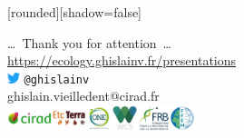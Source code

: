 
{
  [rounded][shadow=false]
  \begin{frame}[plain]
    \begin{block}{}
      \begin{center}
        \ldots~Thank you for attention~\ldots \\
        \url{https://ecology.ghislainv.fr/presentations}\\
        \includegraphics[height=0.3cm]{figs/Twitter_Bird}
        \texttt{@ghislainv}\\
        ghislain.vieilledent@cirad.fr\\
        \includegraphics[height=0.75cm]{figs/partners_logos}
      \end{center}
    \end{block}
  \end{frame}
}